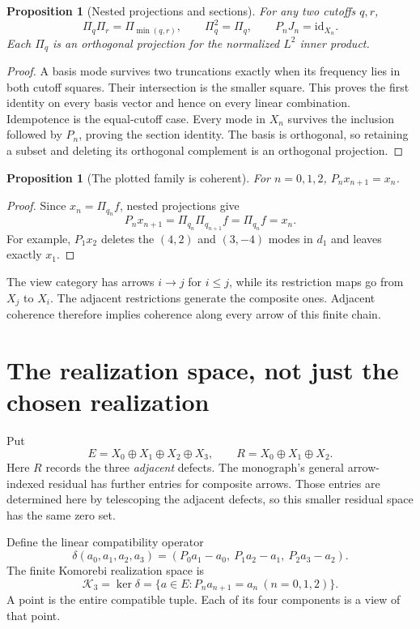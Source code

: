 \documentclass[11pt]{article}
\newtheorem{proposition}[theorem]{Proposition}
\theoremstyle{definition}
\theoremstyle{remark}
\newcommand{\K}{\mathcal K}
\newcommand{\id}{\mathrm{id}}
\begin{document}
\begin{proposition}[Nested projections and sections]
For any two cutoffs $q,r$,
\[
 \Pi_q\Pi_r=\Pi_{\min(q,r)},\qquad \Pi_q^2=\Pi_q,
 \qquad P_nJ_n=\id_{X_n}.
\]
Each $\Pi_q$ is an orthogonal projection for the normalized $L^2$ inner product.
\end{proposition}
\begin{proof}
A basis mode survives two truncations exactly when its frequency lies in both cutoff squares. Their intersection is the smaller square. This proves the first identity on every basis vector and hence on every linear combination. Idempotence is the equal-cutoff case. Every mode in $X_n$ survives the inclusion followed by $P_n$, proving the section identity. The basis is orthogonal, so retaining a subset and deleting its orthogonal complement is an orthogonal projection.
\end{proof}

\begin{proposition}[The plotted family is coherent]
For $n=0,1,2$, $P_nx_{n+1}=x_n$.
\end{proposition}
\begin{proof}
Since $x_n=\Pi_{q_n}f$, nested projections give
\[
 P_nx_{n+1}=\Pi_{q_n}\Pi_{q_{n+1}}f
 =\Pi_{q_n}f=x_n.
\]
For example, $P_1x_2$ deletes the $(4,2)$ and $(3,-4)$ modes in $d_1$ and leaves exactly $x_1$.
\end{proof}

The view category has arrows $i\to j$ for $i\leq j$, while its restriction maps go from $X_j$ to $X_i$. The adjacent restrictions generate the composite ones. Adjacent coherence therefore implies coherence along every arrow of this finite chain.

\section{The realization space, not just the chosen realization}
\label{sec:space}
Put
\[
 E=X_0\oplus X_1\oplus X_2\oplus X_3,\qquad
 R=X_0\oplus X_1\oplus X_2.
\]
Here $R$ records the three \emph{adjacent} defects. The monograph's general arrow-indexed residual has further entries for composite arrows. Those entries are determined here by telescoping the adjacent defects, so this smaller residual space has the same zero set.

Define the linear compatibility operator
\[
 \delta(a_0,a_1,a_2,a_3)=
 (P_0a_1-a_0,\ P_1a_2-a_1,\ P_2a_3-a_2).
\]
The finite Komorebi realization space is
\[
 \K_3=\ker\delta
 =\{a\in E:P_na_{n+1}=a_n\ (n=0,1,2)\}.
\]
A point is the entire compatible tuple. Each of its four components is a view of that point.
\end{document}
